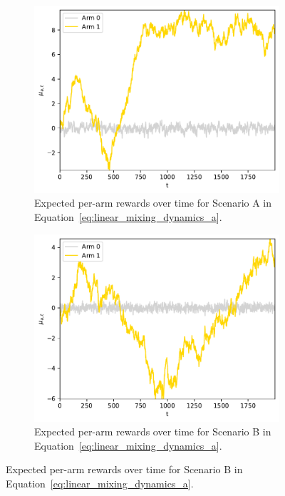 \begin{figure}[!h]
	\centering
	\begin{subfigure}[b]{0.45\textwidth}
		\includegraphics[width=\textwidth]{./fods_figs/dynamic/linearGaussian/dynamics_a}
		\caption{Expected per-arm rewards over time for Scenario A in Equation~\eqref{eq:linear_mixing_dynamics_a}.}
		\label{fig:linear_mixing_dynamics_a_gaussian_2}
	\end{subfigure}\qquad
	\begin{subfigure}[b]{0.45\textwidth}
		\includegraphics[width=\textwidth]{./fods_figs/dynamic/linearGaussian/dynamics_b}
		\caption{Expected per-arm rewards over time for Scenario B in Equation~\eqref{eq:linear_mixing_dynamics_a}.}
		\label{fig:linear_mixing_dynamics_b_gaussian_2}
	\end{subfigure}
	

\end{figure}
